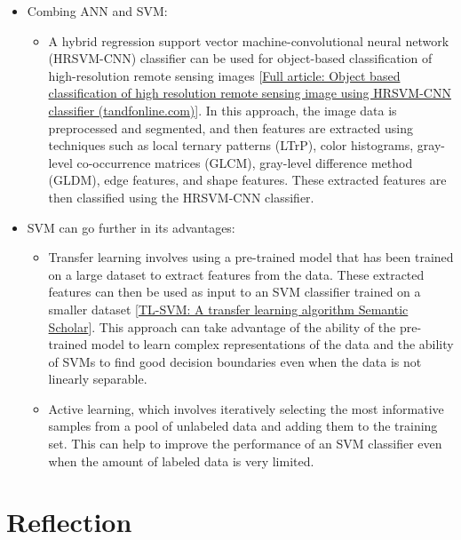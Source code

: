 \documentclass[
  letterpaper,
  DIV=11,
  numbers=noendperiod]{scrreprt}
\providecommand{\tightlist}{%
  \setlength{\itemsep}{0pt}\setlength{\parskip}{0pt}}\usepackage{longtable,booktabs,array}
\begin{document}
\begin{itemize}
\tightlist
\item
  Combing ANN and SVM:

  \begin{itemize}
  \tightlist
  \item
    A hybrid regression support vector machine-convolutional neural
    network (HRSVM-CNN) classifier can be used for object-based
    classification of high-resolution remote sensing images
    {[}\href{https://www.tandfonline.com/doi/full/10.1080/22797254.2019.1680259}{Full
    article: Object based classification of high resolution remote
    sensing image using HRSVM-CNN classifier (tandfonline.com)}{]}. In
    this approach, the image data is preprocessed and segmented, and
    then features are extracted using techniques such as local ternary
    patterns (LTrP), color histograms, gray-level co-occurrence matrices
    (GLCM), gray-level difference method (GLDM), edge features, and
    shape features. These extracted features are then classified using
    the HRSVM-CNN classifier.
  \end{itemize}
\item
  SVM can go further in its advantages:

  \begin{itemize}
  \tightlist
  \item
    Transfer learning involves using a pre-trained model that has been
    trained on a large dataset to extract features from the data. These
    extracted features can then be used as input to an SVM classifier
    trained on a smaller dataset
    {[}\href{https://www.semanticscholar.org/paper/TL-SVM\%3A-A-transfer-learning-algorithm-Min-Shitong/b1c61b7d42a6eb539662e03971a6c8496782b789}{TL-SVM:
    A transfer learning algorithm \textbar{} Semantic Scholar}{]}. This
    approach can take advantage of the ability of the pre-trained model
    to learn complex representations of the data and the ability of SVMs
    to find good decision boundaries even when the data is not linearly
    separable.
  \item
    Active learning, which involves iteratively selecting the most
    informative samples from a pool of unlabeled data and adding them to
    the training set. This can help to improve the performance of an SVM
    classifier even when the amount of labeled data is very limited.
  \end{itemize}
\end{itemize}

\hypertarget{reflection-4}{%
\section{Reflection}\label{reflection-4}}
\end{document}
